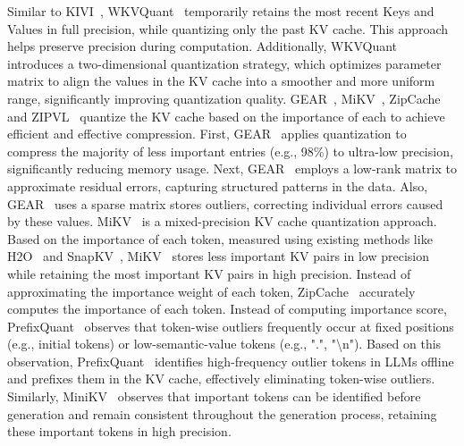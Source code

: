 Similar to KIVI~\cite{liu2024kivi}, WKVQuant~\cite{yue2024wkvquant} temporarily retains the most recent Keys and Values in full precision, while quantizing only the past KV cache. 
This approach helps preserve precision during computation. Additionally, WKVQuant~\cite{yue2024wkvquant} introduces a two-dimensional quantization strategy, which optimizes parameter matrix to align the values in the KV cache into a smoother and more uniform range, significantly improving quantization quality.
GEAR~\cite{kang2024gear}, MiKV~\cite{yang2024no}, ZipCache~\cite{he2024zipcache}  and ZIPVL~\cite{he2024zipvl}  quantize the KV cache based on the importance of each to achieve efficient and effective compression.
First, GEAR~\cite{kang2024gear} applies quantization to compress the majority of less important entries (e.g., 98\%) to ultra-low precision, significantly reducing memory usage. Next, GEAR~\cite{kang2024gear} employs a low-rank matrix to approximate residual errors, capturing structured patterns in the data. Also, GEAR~\cite{kang2024gear} uses a sparse matrix stores outliers, correcting individual errors caused by these values.
MiKV~\cite{yang2024no} is a mixed-precision KV cache quantization approach. Based on the importance of each token, measured using existing methods like H2O~\cite{zhang2023h2o} and SnapKV~\cite{li2024snapkv}, MiKV~\cite{yang2024no} stores less important KV pairs in low precision while retaining the most important KV pairs in high precision.
Instead of approximating the importance weight of each token, ZipCache~\cite{he2024zipcache} accurately computes the importance of each token.
Instead of computing importance score, PrefixQuant~\cite{chen2024prefixquant} observes that token-wise outliers frequently occur at fixed positions (e.g., initial tokens) or low-semantic-value tokens (e.g., ".", "\textbackslash n").
Based on this observation, PrefixQuant~\cite{chen2024prefixquant} identifies high-frequency outlier tokens in LLMs offline and prefixes them in the KV cache, effectively eliminating token-wise outliers.
Similarly, MiniKV~\cite{sharma2024minikvpushinglimitsllm} observes that important tokens can be identified before generation and remain consistent throughout the generation process, retaining these important tokens in high precision.



